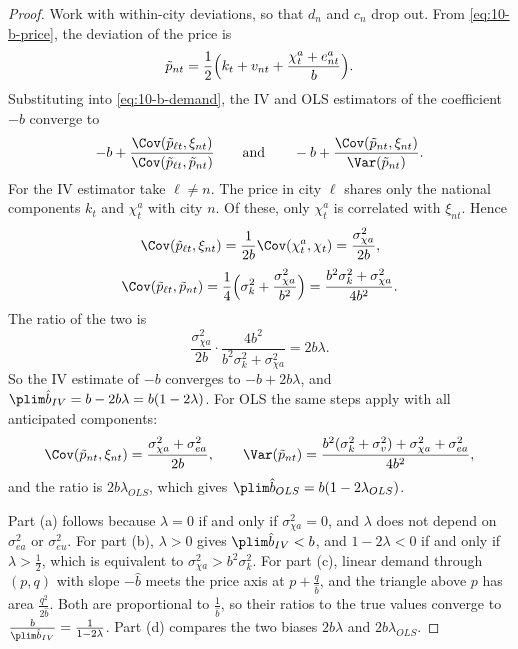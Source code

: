 \begin{proof}
Work with within-city deviations, so that $d_n$ and $c_n$ drop out. From \eqref{eq:10-b-price}, the deviation
of the price is
\begin{equation*}
  \tilde p_{nt} = \frac{1}{2}\Bigl(k_t + v_{nt} + \frac{\chi^a_t + e^a_{nt}}{b}\Bigr).
\end{equation*}
Substituting into \eqref{eq:10-b-demand}, the IV and OLS estimators of the coefficient $-b$ converge to
\begin{equation*}
  -b + \frac{\Cov(\tilde p_{\ell t},\xi_{nt})}{\Cov(\tilde p_{\ell t},\tilde p_{nt})}
  \qquad\text{and}\qquad
  -b + \frac{\Cov(\tilde p_{nt},\xi_{nt})}{\Var(\tilde p_{nt})}.
\end{equation*}
For the IV estimator take $\ell\neq n$. The price in city $\ell$ shares only the national components $k_t$ and
$\chi^a_t$ with city $n$. Of these, only $\chi^a_t$ is correlated with $\xi_{nt}$. Hence
\begin{equation*}
  \Cov(\tilde p_{\ell t},\xi_{nt}) = \frac{1}{2b}\Cov(\chi^a_t,\chi_t) = \frac{\sigma_{\chi a}^2}{2b},
\end{equation*}
\begin{equation*}
  \Cov(\tilde p_{\ell t},\tilde p_{nt}) = \frac{1}{4}\Bigl(\sigma_k^2 + \frac{\sigma_{\chi a}^2}{b^2}\Bigr)
  = \frac{b^2\sigma_k^2 + \sigma_{\chi a}^2}{4b^2}.
\end{equation*}
The ratio of the two is
\begin{equation*}
  \frac{\sigma_{\chi a}^2}{2b}\cdot\frac{4b^2}{b^2\sigma_k^2 + \sigma_{\chi a}^2} = 2b\lambda.
\end{equation*}
So the IV estimate of $-b$ converges to $-b + 2b\lambda$, and $\plim\hat b_{IV} = b - 2b\lambda = b(1 - 2\lambda)$.
For OLS the same steps apply with all anticipated components:
\begin{equation*}
  \Cov(\tilde p_{nt},\xi_{nt}) = \frac{\sigma_{\chi a}^2 + \sigma_{ea}^2}{2b}, \qquad
  \Var(\tilde p_{nt}) = \frac{b^2(\sigma_k^2 + \sigma_v^2) + \sigma_{\chi a}^2 + \sigma_{ea}^2}{4b^2},
\end{equation*}
and the ratio is $2b\lambda_{OLS}$, which gives $\plim\hat b_{OLS} = b(1 - 2\lambda_{OLS})$.

Part (a) follows because $\lambda = 0$ if and only if $\sigma_{\chi a}^2 = 0$, and $\lambda$ does not depend
on $\sigma_{ea}^2$ or $\sigma_{eu}^2$. For part (b), $\lambda > 0$ gives $\plim\hat b_{IV} < b$, and
$1 - 2\lambda < 0$ if and only if $\lambda > \frac{1}{2}$, which is equivalent to
$\sigma_{\chi a}^2 > b^2\sigma_k^2$. For part (c), linear demand through $(p, q)$ with slope $-\hat b$ meets
the price axis at $p + \frac{q}{\hat b}$, and the triangle above $p$ has area $\frac{q^2}{2\hat b}$. Both are
proportional to $\frac{1}{\hat b}$, so their ratios to the true values converge to
$\frac{b}{\plim\hat b_{IV}} = \frac{1}{1 - 2\lambda}$. Part (d) compares the two biases $2b\lambda$ and
$2b\lambda_{OLS}$.
\end{proof}

